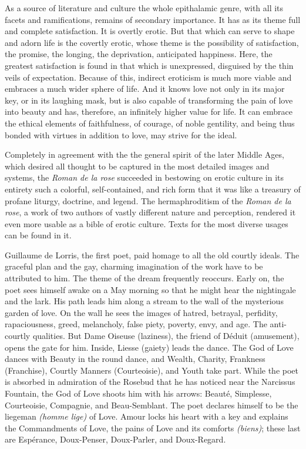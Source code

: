 As a source of literature and culture the whole epithalamic genre, with
all its facets and ramifications, remains of secondary importance. It
has as its theme full and complete satisfaction. It is overtly erotic.
But that which can serve to shape and adorn life is the covertly erotic,
whose theme is the possibility of satisfaction, the promise, the
longing, the deprivation, anticipated happiness. Here, the greatest
satisfaction is found in that which is unexpressed, disguised by the
thin veils of expectation. Because of this, indirect eroticism is much
more viable and embraces a much wider sphere of life. And it knows love
not only in its major key, or in its laughing mask, but is also capable
of transforming the pain of love into beauty and has, therefore, an
infinitely higher value for life. It can embrace the ethical elements of
faithfulness, of courage, of noble gentility, and being thus bonded with
virtues in addition to love, may strive for the ideal.

Completely in agreement with the the general spirit of the later Middle
Ages, which desired all thought to be captured in the most detailed
images and systems, the \emph{Roman de la rose} succeeded in bestowing
on erotic culture in its entirety such a colorful, self-contained, and
rich form that it was like a treasury of profane liturgy, doctrine, and
legend. The hermaphroditism of the \emph{Roman de la rose}, a work of
two authors of vastly different nature and perception, rendered it even
more usable as a bible of erotic culture. Texts for the most diverse
usages can be found in it.

Guillaume de Lorris, the first poet, paid homage to all the old courtly
ideals. The graceful plan and the gay, charming imagination of the work
have to be attributed to him. The theme of the dream frequently
reoccurs. Early on, the poet sees himself awake on a May morning so that
he might hear the nightingale and the lark. His path leads him along a
stream to the wall of the mysterious garden of love. On the wall he sees
the images of hatred, betrayal,
\protect\hypertarget{11_Chapter_Four__THE_FORMS_OF_LOVE.xhtmlux5cux23page_134}{}{}perfidity,
rapaciousness, greed, melancholy, false piety, poverty, envy, and age.
The anti-courtly qualities. But Dame Oiseuse (laziness), the friend of
Déduit (amusement), opens the gate for him. Inside, Liesse (gaiety)
leads the dance. The God of Love dances with Beauty in the round dance,
and Wealth, Charity, Frankness (Franchise), Courtly Manners
(Courteoisie), and Youth take part. While the poet is absorbed in
admiration of the Rosebud that he has noticed near the Narcissus
Fountain, the God of Love shoots him with his arrows: Beauté, Simplesse,
Courteoisie, Compagnie, and Beau-Semblant. The poet declares himself to
be the liegeman \emph{(homme lige)} of Love. Amour locks his heart with
a key and explains the Commandments of Love, the pains of Love and its
comforts \emph{(biens)}; these last are Espérance, Doux-Penser,
Doux-Parler, and Doux-Regard.

